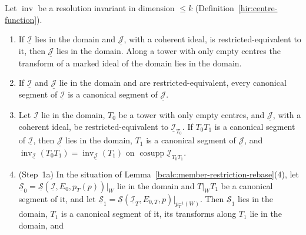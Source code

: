 \begin{lemma}
\label{bcalc:inv-rebase}
\mixedleanok
Let \(\operatorname{inv}\) be a resolution invariant in dimension \(\le k\) (Definition~\ref{hir:centre-function}).
\begin{enumerate}
\item If \(\underline{\mathcal I}\) lies in the domain and \(\underline{\mathcal J}\), with a coherent ideal, is restricted-equivalent to it, then \(\underline{\mathcal J}\) lies in the
domain. Along a tower with only empty centres the transform of a marked ideal of the domain lies in the domain.
\item If \(\underline{\mathcal I}\) and \(\underline{\mathcal J}\) lie in the domain and are restricted-equivalent, every canonical segment of \(\underline{\mathcal I}\) is a canonical segment of
\(\underline{\mathcal J}\).
\item Let \(\underline{\mathcal I}\) lie in the domain, \(T_0\) be a tower with only empty centres, and \(\underline{\mathcal J}\), with a coherent ideal, be restricted-equivalent to
\(\underline{\mathcal I}_{T_0}\). If \(T_0T_1\) is a canonical segment of \(\underline{\mathcal I}\), then \(\underline{\mathcal J}\) lies in the domain, \(T_1\) is a canonical segment of
\(\underline{\mathcal J}\), and \(\operatorname{inv}_{\underline{\mathcal I}}(T_0T_1)=\operatorname{inv}_{\underline{\mathcal J}}(T_1)\) on \(\operatorname{cosupp}\underline{\mathcal I}_{T_0T_1}\).
\item (Step~1a) In the situation of Lemma~\ref{bcalc:member-restriction-rebase}(4), let \(\underline{\mathcal S}_0=\underline{\mathcal S}(\underline{\mathcal I},E_0,p_T(p))|_W\) lie in the
domain and \(T|_WT_1\) be a canonical segment of it, and let \(\underline{\mathcal S}_1=\underline{\mathcal S}(\underline{\mathcal I}_T,E_{0,T},p)|_{p_T^{-1}(W)}\). Then
\(\underline{\mathcal S}_1\) lies in the domain, \(T_1\) is a canonical segment of it, its transforms along \(T_1\) lie in the domain, and

\end{enumerate}
\end{lemma}
